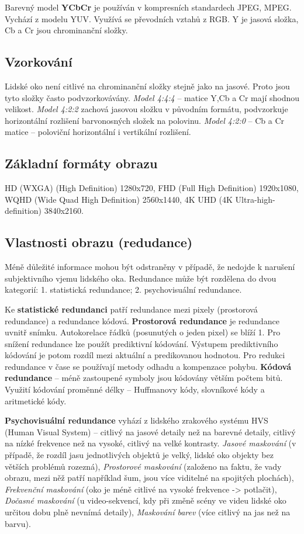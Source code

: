 Barevný model \textbf{YCbCr} je používán v kompresních standardech JPEG, MPEG. Vychází z modelu YUV. Využívá se převodních vztahů z RGB. Y je jasová složka, Cb a Cr jsou chrominanční složky. 

\subsection{Vzorkování}

Lidské oko není citlivé na chrominanční složky stejně jako na jasové. Proto jsou tyto složky často podvzorkovávány. \textit{Model 4:4:4} -- matice Y,Cb a Cr mají shodnou velikost. \textit{Model 4:2:2} zachová jasovou složku v původním formátu, podvzorkuje horizontální rozlišení barvonosných složek na polovinu. \textit{Model 4:2:0} -- Cb a Cr matice – poloviční horizontální i vertikální rozlišení.

\subsection{Základní formáty obrazu}

HD (WXGA) (High Definition) 1280x720, FHD (Full High Definition) 1920x1080, WQHD (Wide Quad High Definition) 2560x1440, 4K UHD (4K Ultra-high-definition) 3840x2160.


\subsection{Vlastnosti obrazu (redudance)}

Méně důležité informace mohou být odstraněny v případě, že nedojde k narušení subjektivního vjemu lidského oka. Redundance může být rozdělena do dvou kategorií: 1. statistická redundance; 2. psychovisuální redundance.

Ke \textbf{statistické redundanci} patří redundance mezi pixely (prostorová redundance) a redundance kódová. \textbf{Prostorová redundance} je redundance uvnitř snímku. Autokorelace řádků (posunutých o jeden pixel) se blíží 1. Pro snížení redundance lze použít prediktivní kódování. Výstupem prediktivního kódování je potom rozdíl mezi aktuální a predikovanou hodnotou. Pro redukci redundance v čase se používají metody odhadu a kompenzace pohybu. \textbf{Kódová redundance} -- méně zastoupené symboly jsou kódovány větším počtem bitů. Využití kódování proměnné délky -- Huffmanovy kódy, slovníkové kódy a aritmetické kódy.

\textbf{Psychovisuální redundance} vyhází z lidského zrakového systému HVS (Human Visual System) -- citlivý na jasové detaily než na barevné detaily, citlivý na nízké frekvence než na vysoké, citlivý na velké kontrasty. \textit{Jasové maskování} (v případě, že rozdíl jasu jednotlivých objektů je velký, lidské oko objekty bez větších problémů rozezná), \textit{Prostorové maskování} (založeno na faktu, že vady obrazu, mezi něž patří například šum, jsou více viditelné na spojitých plochách), \textit{Frekvenční maskování} (oko je méně citlivé na vysoké frekvence -> potlačit), \textit{Dočasné maskování} (u video-sekvencí, kdy při změně scény ve videu lidské oko určitou dobu plně nevnímá detaily), \textit{Maskování barev }(více citlivý na jas než na barvu).

